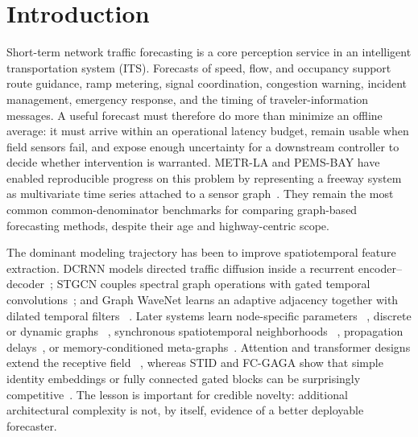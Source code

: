 \documentclass[pdflatex,sn-mathphys-num]{sn-jnl}
\begin{document}
\section{Introduction}
Short-term network traffic forecasting is a core perception service in an
intelligent transportation system (ITS). Forecasts of speed, flow, and
occupancy support route guidance, ramp metering, signal coordination,
congestion warning, incident management, emergency response, and the timing of
traveler-information messages. A useful forecast must therefore do more than
minimize an offline average: it must arrive within an operational latency
budget, remain usable when field sensors fail, and expose enough uncertainty
for a downstream controller to decide whether intervention is warranted.
METR-LA and PEMS-BAY have enabled reproducible progress on this problem by
representing a freeway system as multivariate time series attached to a sensor
graph~\cite{li2018dcrnn}. They remain the most common common-denominator
benchmarks for comparing graph-based forecasting methods, despite their age
and highway-centric scope.

The dominant modeling trajectory has been to improve spatiotemporal feature
extraction. DCRNN models directed traffic diffusion inside a recurrent
encoder--decoder~\cite{li2018dcrnn}; STGCN couples spectral graph operations
with gated temporal convolutions~\cite{yu2018stgcn}; and Graph WaveNet learns an
adaptive adjacency together with dilated temporal filters
~\cite{wu2019graphwavenet}. Later systems learn node-specific parameters
~\cite{bai2020agcrn}, discrete or dynamic graphs
~\cite{shang2021gts,shao2022d2stgnn}, synchronous spatiotemporal neighborhoods
~\cite{song2020stsgcn}, propagation delays~\cite{jiang2023pdformer}, or
memory-conditioned meta-graphs~\cite{jiang2023megacrn}. Attention and
transformer designs extend the receptive field
~\cite{zheng2020gman,lan2022dstagnn,liu2023staeformer}, whereas STID and FC-GAGA
show that simple identity embeddings or fully connected gated blocks can be
surprisingly competitive~\cite{shao2022stid,oreshkin2021fcgaga}. The lesson is
important for credible novelty: additional architectural complexity is not, by
itself, evidence of a better deployable forecaster.
\end{document}
